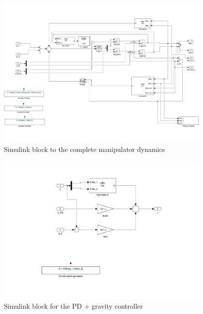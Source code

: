 \documentclass[a4paper]{scrartcl}
\begin{document}
\begin{figure}[ht]
	\centering
	\includegraphics[width=0.95\textwidth]{fig/dynamics.pdf}
	\caption{Simulink block to the complete manipulator dynamics}
	\label{fig:dynamics}
\end{figure}
\begin{figure}[ht]
	\centering
	\includegraphics[width=0.95\textwidth]{fig/PDgravity.pdf}
	\caption{Simulink block for the PD + gravity controller}
	\label{fig:PDgravity}
\end{figure}
\end{document}
